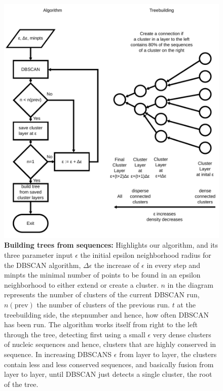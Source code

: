 \begin{figure}
  \begin{center}
  \includegraphics[scale=0.8]{algorithm.pdf}
  \end{center}
  \caption{\textbf{Building trees from sequences:} Highlights our
    algorithm, and its three parameter input $\epsilon$ the initial
    epsilon neighborhood radius for the DBSCAN algorithm, $\Delta
    \epsilon$ the increase of $\epsilon$ in every step and minpts the
    minimal number of points to be found in an epsilon neighborhood to
    either extend or create a cluster. $n$ in the
    diagram represents the number of clusters of the current DBSCAN
    run, $n(\mathrm{prev})$ the number of clusters of the previous
    run. $t$ at the treebuilding side, the stepnumber and hence, how
    often DBSCAN has been run.
    The algorithm works itself from right to the left through the
    tree, detecting first using a small $\epsilon$ very dense clusters
    of nucleic sequences and hence, clusters that are highly conserved
    in sequence. In increasing DBSCANS $\epsilon$ from layer to layer,
    the clusters contain less and less conserved sequences, and
    basically fusion from layer to layer, until DBSCAN just detects a
    single cluster, the root of the tree.}
  \label{fig-adaptive-dbscan}
\end{figure}
